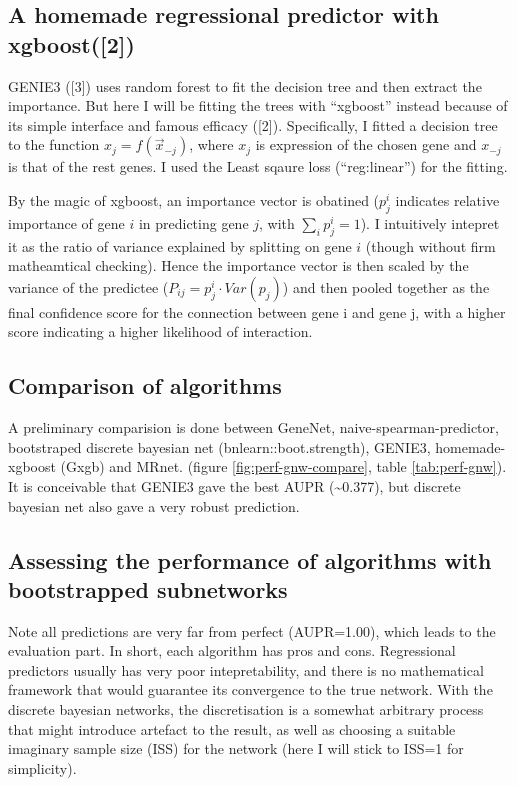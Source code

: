 \documentclass[]{article}
\theoremstyle{definition}
\theoremstyle{definition}
\theoremstyle{definition}
\theoremstyle{remark}
\begin{document}
\subsection{A homemade regressional predictor with
xgboost({[}2{]})}\label{a-homemade-regressional-predictor-with-xgboostxgboost}

GENIE3 ({[}3{]}) uses random forest to fit the decision tree and then
extract the importance. But here I will be fitting the trees with
``xgboost'' instead because of its simple interface and famous efficacy
({[}2{]}). Specifically, I fitted a decision tree to the function
\(x_j = f(\vec{x}_{-j})\), where \(x_j\) is expression of the chosen
gene and \(x_{-j}\) is that of the rest genes. I used the Least sqaure
loss (``reg:linear'') for the fitting.

By the magic of xgboost, an importance vector is obatined (\(p_j^i\)
indicates relative importance of gene \(i\) in predicting gene \(j\),
with \(\sum_{i}p_j^i=1\)). I intuitively intepret it as the ratio of
variance explained by splitting on gene \(i\) (though without firm
matheamtical checking). Hence the importance vector is then scaled by
the variance of the predictee (\(P_{ij}=p_j^i\cdot Var(p_j)\)) and then
pooled together as the final confidence score for the connection between
gene i and gene j, with a higher score indicating a higher likelihood of
interaction.

\subsection{Comparison of algorithms}\label{comparison-of-algorithms}

A preliminary comparision is done between GeneNet,
naive-spearman-predictor, bootstraped discrete bayesian net
(bnlearn::boot.strength), GENIE3, homemade-xgboost (Gxgb) and MRnet.
(figure \ref{fig:perf-gnw-compare}, table \ref{tab:perf-gnw}). It is
conceivable that GENIE3 gave the best AUPR (\textasciitilde{}0.377), but
discrete bayesian net also gave a very robust prediction.

\subsection{Assessing the performance of algorithms with bootstrapped
subnetworks}\label{assessing-the-performance-of-algorithms-with-bootstrapped-subnetworks}

Note all predictions are very far from perfect (AUPR=1.00), which leads
to the evaluation part. In short, each algorithm has pros and cons.
Regressional predictors usually has very poor intepretability, and there
is no mathematical framework that would guarantee its convergence to the
true network. With the discrete bayesian networks, the discretisation is
a somewhat arbitrary process that might introduce artefact to the
result, as well as choosing a suitable imaginary sample size (ISS) for
the network (here I will stick to ISS=1 for simplicity).
\end{document}
